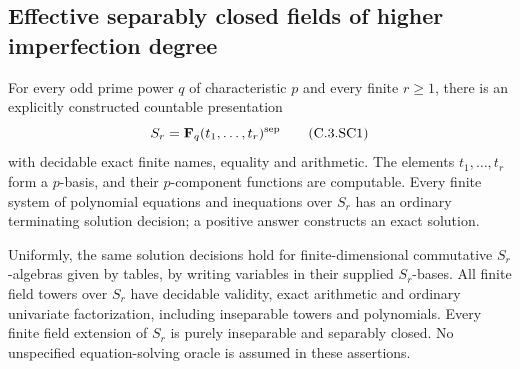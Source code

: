 \subsection{Effective separably closed fields of higher imperfection degree}
\label{C:separably-closed-subsection}

\begin{theorem}
\label{C:separably-closed-effective-arithmetic}
For every odd prime power $q$ of characteristic $p$
and every finite $r\ge1$, there is an explicitly
constructed countable presentation
\[
       S_r=\mathbf F_q(t_1,\ldots,t_r)^{\rm sep}        \tag{C.3.SC1}
\]
with decidable exact finite names, equality and
arithmetic.  The elements $t_1,\ldots,t_r$
form a $p$-basis, and their $p$-component
functions are computable.
Every finite system of polynomial equations
and inequations over $S_r$ has an ordinary
terminating solution decision; a positive
answer constructs an exact solution.

Uniformly, the same solution decisions hold
for finite-dimensional commutative $S_r$-algebras
given by tables, by writing variables in their
supplied $S_r$-bases.
All finite field towers over $S_r$ have
decidable validity, exact arithmetic and
ordinary univariate factorization, including
inseparable towers and polynomials.
Every finite field extension of $S_r$ is
purely inseparable and separably closed.
No unspecified equation-solving oracle is
assumed in these assertions.
\end{theorem}
